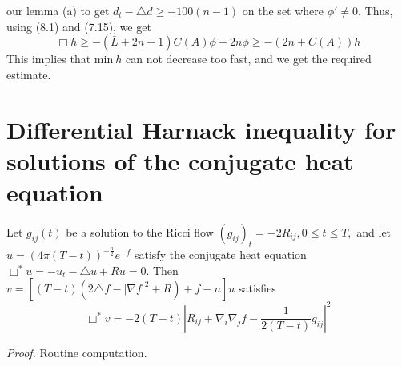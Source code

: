 \documentclass[12pt]{article}
\theoremstyle{plain}
{\swapnumbers
\newtheorem{thm}{Theorem}[section]
\newtheorem{cor}[thm]{Corollary}
\newtheorem{lem}[thm]{Lemma}
\newtheorem{prop}[thm]{Proposition}
}
\theoremstyle{definition}
{\swapnumbers
\newtheorem{defn}[thm]{Definition}
\newtheorem{nota}[thm]{Notation}
\newtheorem{parag}[thm]{}
\newtheorem*{parstr}{\addtocounter{thm}{1}\thesection.\arabic{thm}*}
\newtheorem*{intropar}{\addtocounter{thm}{1}\arabic{thm}}
}
\theoremstyle{remark} {\swapnumbers
\newtheorem{rem}[thm]{Remark}
\newtheorem{exam}[thm]{Example}
\newtheorem{lemma}[thm]{Lemma}
\newtheorem{claim}[thm]{Claim}
}
\numberwithin{equation}{section}
\begin{document}
 our lemma (a) to get $d_t-\triangle d\ge-100(n-1)$ on the set where
 $\phi '\neq 0.$ Thus, using (8.1) and (7.15), we get $$ \Box
 h\ge-(\bar{L}+2n+1)C(A)\phi-2n\phi\ge-(2n+C(A))h$$ This implies
 that $\mbox{min}\ h$ can not decrease too fast, and we get the
 required estimate. \section {Differential Harnack inequality for
 solutions of the conjugate heat equation} \begin{prop}  Let
 $g_{ij}(t)$ be a solution to the Ricci flow $(g_{ij})_t=-2R_{ij},
 0\le t\le T,$ and let $u=(4\pi(T-t))^{-\frac{n}{2}}e^{-f}$
 satisfy the conjugate heat equation $\Box^*u=-u_t-\triangle
 u+Ru=0.$ Then $v=[(T-t)(2\triangle f-|\nabla f|^2+R)+f-n]u$
 satisfies \begin{equation} \Box^*v=-2(T-t)|R_{ij}+\nabla_i\nabla_j
 f-\frac{1}{2(T-t)}g_{ij}|^2 \end{equation} \end{prop} {\it Proof.}  Routine computation.
\end{document}
